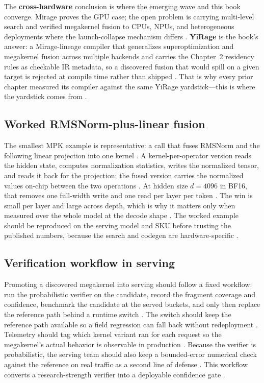 The \textbf{cross-hardware} conclusion is where the emerging wave and this book converge. Mirage proves the GPU case; the open problem is carrying multi-level search and verified megakernel fusion to CPUs, NPUs, and heterogeneous deployments where the launch-collapse mechanism differs \citep{amd2024xdna,amd2024aie}. \textbf{YiRage} is the book's answer: a Mirage-lineage compiler that generalizes superoptimization and megakernel fusion across multiple backends and carries the Chapter~2 residency rules as checkable IR metadata, so a discovered fusion that would spill on a given target is rejected at compile time rather than shipped \citep{yirage2026}. That is why every prior chapter measured its compiler against the same YiRage yardstick---this is where the yardstick comes from \citep{patel2025llminference}.

\subsection{Worked RMSNorm-plus-linear fusion}

The smallest MPK example is representative: a call that fuses RMSNorm and the following linear projection into one kernel \citep{mpk2025}. A kernel-per-operator version reads the hidden state, computes normalization statistics, writes the normalized tensor, and reads it back for the projection; the fused version carries the normalized values on-chip between the two operations \citep{mpk2025,memoryfloor2026}. At hidden size $d{=}4096$ in BF16, that removes one full-width write and one read per layer per token \citep{memoryfloor2026,taxbreak2026}. The win is small per layer and large across depth, which is why it matters only when measured over the whole model at the decode shape \citep{dao2022flashattention,patel2025llminference}. The worked example should be reproduced on the serving model and SKU before trusting the published numbers, because the search and codegen are hardware-specific \citep{wu2024mirage,nvidia2022hopper}.

\subsection{Verification workflow in serving}

Promoting a discovered megakernel into serving should follow a fixed workflow: run the probabilistic verifier on the candidate, record the fragment coverage and confidence, benchmark the candidate at the served buckets, and only then replace the reference path behind a runtime switch \citep{wu2024mirage,patel2025llminference}. The switch should keep the reference path available so a field regression can fall back without redeployment \citep{mpk2025,memoryfloor2026}. Telemetry should tag which kernel variant ran for each request so the megakernel's actual behavior is observable in production \citep{patel2025llminference,taxbreak2026}. Because the verifier is probabilistic, the serving team should also keep a bounded-error numerical check against the reference on real traffic as a second line of defense \citep{wu2024mirage,memoryfloor2026}. This workflow converts a research-strength verifier into a deployable confidence gate \citep{wu2024mirage,chen2020compilerbasedhardw}.

